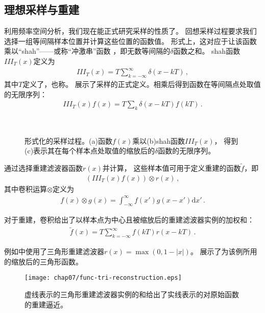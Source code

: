 \subsection{理想采样与重建}\label{sub:理想采样与重建}
利用频率空间分析，我们现在能正式研究采样的性质了。
回想采样过程要求我们选择一组等间隔样本位置并计算这些位置的函数值。
形式上，这对应于让该函数乘以“shah”——或称“冲激串”函数
，即无数等间隔的$\delta$函数之和。
shah函数$III_T(x)$定义为
\begin{align*}
    III_T(x)=T\sum\limits_{k=-\infty}^{\infty}\delta(x-kT)\, ,
\end{align*}
其中$T$定义了，也称。
展示了采样的正式定义。相乘后得到函数在等间隔点处取值的无限序列：
\begin{align*}
    III_T(x)f(x)=T\sum\limits_k\delta(x-kT)f(kT)\, .
\end{align*}
\begin{figure}[htbp]
    \centering
    \,
    \,
    \caption{形式化的采样过程。(a)函数$f(x)$乘以(b)shah函数$III_T(x)$，
        得到(c)表示其在每个样本点处取值的缩放后的$\delta$函数的无限序列。}
    \label{fig:7.4}
\end{figure}

通过选择重建滤波器函数$r(x)$并计算，
这些样本值可用于定义重建的函数$\tilde{f}$，即
\begin{align*}
    (III_T(x)f(x))\otimes r(x)\, ,
\end{align*}
其中卷积运算$\otimes$定义为
\begin{align*}
    f(x)\otimes g(x)=\int_{-\infty}^{\infty}f(x')g(x-x')\mathrm{d}x'\, .
\end{align*}

对于重建，卷积给出了以样本点为中心且被缩放后的重建滤波器实例的加权和：
\begin{align*}
    \tilde{f}(x)=T\sum\limits_{k=-\infty}^{\infty}f(kT)r(x-kT)\, .
\end{align*}

例如中使用了三角形重建滤波器$r(x)=\max(0,1-|x|)$。
展示了为该例所用的缩放后的三角形函数。
\begin{figure}[htbp]
    \centering\texttt{[image: chap07/func-tri-reconstruction.eps]}
    \caption{虚线表示的三角形重建滤波器实例的和给出了实线表示的对原始函数的重建逼近。}
    \label{fig:7.5}
\end{figure}

